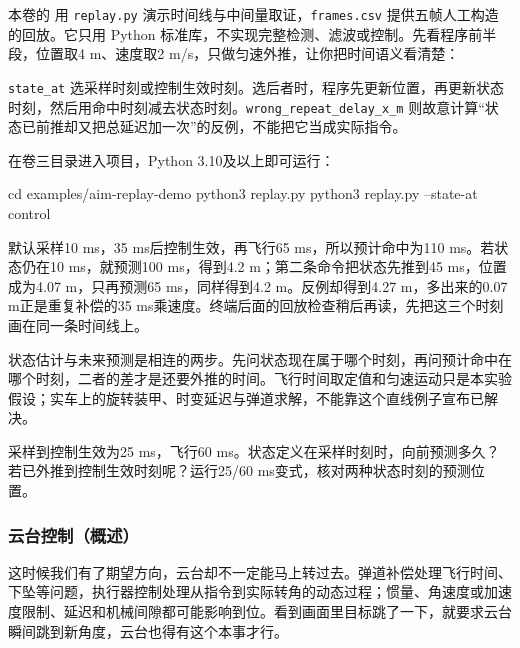 本卷的  用 \texttt{replay.py} 演示时间线与中间量取证，\texttt{frames.csv} 提供五帧人工构造的回放。它只用 Python 标准库，不实现完整检测、滤波或控制。先看程序前半段，位置取4 m、速度取2 m/s，只做匀速外推，让你把时间语义看清楚：




\texttt{state\_at} 选采样时刻或控制生效时刻。选后者时，程序先更新位置，再更新状态时刻，然后用命中时刻减去状态时刻。\texttt{wrong\_repeat\_delay\_x\_m} 则故意计算“状态已前推却又把总延迟加一次”的反例，不能把它当成实际指令。

\begin{example}[画一条预测时间线]
在卷三目录进入项目，Python 3.10及以上即可运行：
\begin{tbash}
cd examples/aim-replay-demo
python3 replay.py
python3 replay.py --state-at control
\end{tbash}
默认采样10 ms，35 ms后控制生效，再飞行65 ms，所以预计命中为110 ms。若状态仍在10 ms，就预测100 ms，得到4.2 m；第二条命令把状态先推到45 ms，位置成为4.07 m，只再预测65 ms，同样得到4.2 m。反例却得到4.27 m，多出来的0.07 m正是重复补偿的35 ms乘速度。终端后面的回放检查稍后再读，先把这三个时刻画在同一条时间线上。
\end{example}

\begin{conclusion}
状态估计与未来预测是相连的两步。先问状态现在属于哪个时刻，再问预计命中在哪个时刻，二者的差才是还要外推的时间。飞行时间取定值和匀速运动只是本实验假设；实车上的旋转装甲、时变延迟与弹道求解，不能靠这个直线例子宣布已解决。
\end{conclusion}

\begin{exercise}
\label{v3-ex-aim-3}
采样到控制生效为25 ms，飞行60 ms。状态定义在采样时刻时，向前预测多久？若已外推到控制生效时刻呢？运行25/60 ms变式，核对两种状态时刻的预测位置。
\end{exercise}

\subsubsection{云台控制（概述）}

这时候我们有了期望方向，云台却不一定能马上转过去。弹道补偿处理飞行时间、下坠等问题，执行器控制处理从指令到实际转角的动态过程；惯量、角速度或加速度限制、延迟和机械间隙都可能影响到位。看到画面里目标跳了一下，就要求云台瞬间跳到新角度，云台也得有这个本事才行。

